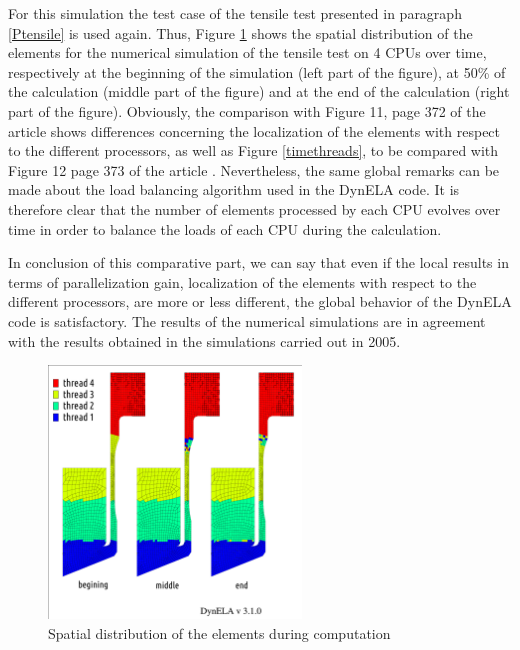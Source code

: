 For this simulation the test case of the tensile test presented in paragraph \ref{Ptensile} is used again. Thus, Figure \ref{spacethreads} shows the spatial distribution of the elements for the numerical simulation of the tensile test on 4 CPUs over time, respectively at the beginning of the simulation (left part of the figure), at 50\% of the calculation (middle part of the figure) and at the end of the calculation (right part of the figure). Obviously, the comparison with Figure 11, page 372 of the article \cite{Pantale:2005} shows differences concerning the localization of the elements with respect to the different processors, as well as Figure \ref{timethreads}, to be compared with Figure 12 page 373 of the article \cite{Pantale:2005}. Nevertheless, the same global remarks can be made about the load balancing algorithm used in the DynELA code. It is therefore clear that the number of elements processed by each CPU evolves over time in order to balance the loads of each CPU during the calculation.

In conclusion of this comparative part, we can say that even if the local results in terms of parallelization gain, localization of the elements with respect to the different processors, are more or less different, the global behavior of the DynELA code is satisfactory. The results of the numerical simulations are in agreement with the results obtained in the simulations carried out in 2005.

\begin{figure}[h!] 
  \centering
  \includegraphics[width=0.6\textwidth]{./spacethreads.pdf}
  \caption{Spatial distribution of the elements during computation}
  \label{spacethreads}
\end{figure}

